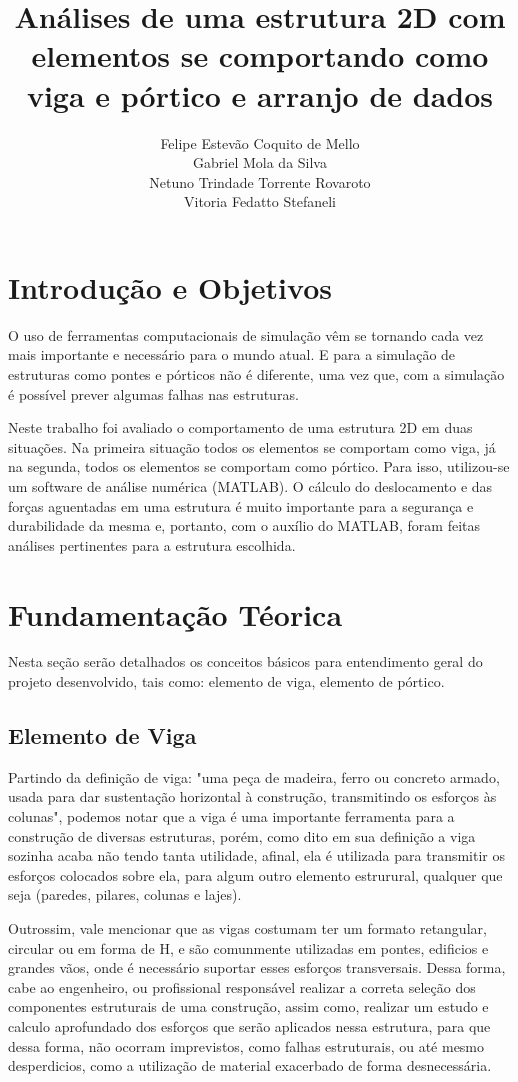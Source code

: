 \documentclass[deposito, acronym, symbols]{fei}
\title{Análises de uma estrutura 2D com elementos se comportando como viga e pórtico e arranjo de dados}
\author{ Felipe Estevão Coquito de Mello \\ Gabriel Mola da Silva \\ Netuno Trindade Torrente Rovaroto \\ Vitoria Fedatto Stefaneli}
\begin{document}
\maketitle

\listoffigures
\listoftables

\chapter{Introdução e Objetivos}

O uso de ferramentas computacionais de simulação vêm se tornando cada vez mais importante e necessário para o mundo atual. E para a simulação de estruturas como pontes e pórticos não é diferente, uma vez que, com a simulação é possível prever algumas falhas nas estruturas.

 Neste trabalho foi avaliado o comportamento de uma estrutura 2D em duas situações. Na primeira situação todos os elementos se comportam como viga, já na segunda, todos os elementos se comportam como pórtico. Para isso, utilizou-se um software de análise numérica (MATLAB). O cálculo do deslocamento e das forças aguentadas em uma estrutura é muito importante para a segurança e durabilidade da mesma e, portanto, com o auxílio do MATLAB, foram feitas análises pertinentes para a estrutura escolhida.

\chapter{Fundamentação Téorica}

Nesta seção serão detalhados os conceitos básicos para entendimento geral do projeto desenvolvido, tais como: elemento de viga, elemento de pórtico.

\section{Elemento de Viga}

Partindo da definição de viga: "uma peça de madeira, ferro ou concreto armado, usada para dar sustentação horizontal à construção, transmitindo os esforços às colunas", podemos notar que a viga é uma importante ferramenta para a construção de diversas estruturas, porém, como dito em sua definição a viga sozinha acaba não tendo tanta utilidade, afinal, ela é utilizada para transmitir os esforços colocados sobre ela, para algum outro elemento estrurural, qualquer que seja (paredes, pilares, colunas e lajes).

Outrossim, vale mencionar que as vigas costumam ter um formato retangular, circular ou em forma de H, e são comunmente utilizadas em pontes, edificios e grandes vãos, onde é necessário suportar esses esforços transversais. Dessa forma, cabe ao engenheiro, ou profissional responsável realizar a correta seleção dos componentes estruturais de uma construção, assim como, realizar um estudo e calculo aprofundado dos esforços que serão aplicados nessa estrutura, para que dessa forma, não ocorram imprevistos, como falhas estruturais, ou até mesmo desperdicios, como a utilização de material exacerbado de forma desnecessária. 
\end{document}
